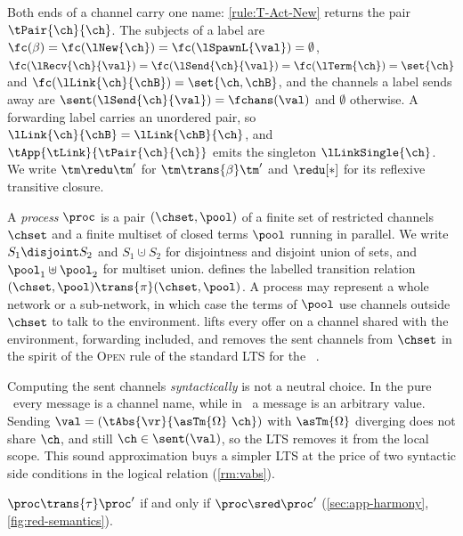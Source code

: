 Both ends of a channel carry one name: \ref{rule:T-Act-New} returns the
pair $\tPair{\ch}{\ch}$. The subjects of a label are
$\fc(\beta) = \fc(\lNew{\ch}) = \fc(\lSpawnL{\val}) = \emptyset$,
$\fc(\lRecv{\ch}{\val}) = \fc(\lSend{\ch}{\val}) = \fc(\lTerm{\ch}) = \set{\ch}$
and $\fc(\lLink{\ch}{\chB}) = \set{\ch,\chB}$, and the channels a label
sends away are $\sent(\lSend{\ch}{\val}) = \fchans(\val)$ and
$\emptyset$ otherwise.
A forwarding label carries an unordered pair, so
$\lLink{\ch}{\chB} = \lLink{\chB}{\ch}$, and
$\tApp{\tLink}{\tPair{\ch}{\ch}}$ emits the singleton
$\lLinkSingle{\ch}$.
We write $\tm \redu \tm'$ for $\tm \trans{\beta} \tm'$ and $\redu[*]$ for
its reflexive transitive closure.


A \emph{process} $\proc$ is a pair $(\chset, \pool)$ of a finite set of
restricted channels $\chset$ and a finite multiset of closed terms
$\pool$ running in parallel.
We write $S_1 \disjoint S_2$ and $S_1 \cupdot S_2$ for disjointness and
disjoint union of sets, and $\pool_1 \uplus \pool_2$ for multiset union.
 defines the labelled transition relation
$(\chset,\pool) \trans{\pi} (\chset,\pool)$.
A process may represent a whole network or a sub-network, in which case
the terms of $\pool$ use channels outside $\chset$ to talk to the
environment.
 lifts every offer on a channel shared with the
environment, forwarding included, and removes the sent channels from
$\chset$ in the spirit of the \textsc{Open} rule of the standard LTS for
the \picalc~\cite{lts-pi}.

\begin{remark}
\label{rm:sentc}
Computing the sent channels \emph{syntactically} is not a neutral
choice. In the pure \picalc\ every message is a channel name, while in
\OurLang\ a message is an arbitrary value. Sending
$\val = (\tAbs{\vr}{\asTm{\Omega}\ \ch})$ with $\asTm{\Omega}$ diverging
does not share $\ch$, and still $\ch \in \sent(\val)$, so the LTS
removes it from the local scope. This sound approximation buys a simpler
LTS at the price of two syntactic side conditions in the logical
relation (\cref{rm:vabs}).
\end{remark}

\begin{theorem}
  \label{thm:harmony}
  $\proc \trans{\tau} \proc'$
  if and only if
  $\proc \sred \proc'$
  (\cref{sec:app-harmony}, \cref{fig:red-semantics}).
\end{theorem}



